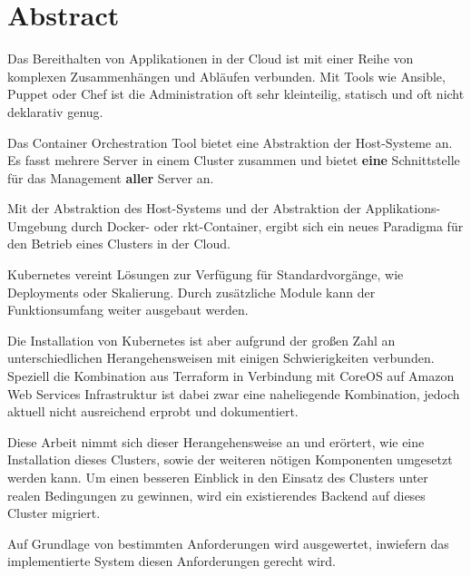 \chapter{Abstract}

Das Bereithalten von Applikationen in der Cloud
ist mit einer Reihe von komplexen Zusammenh\"angen und Abl\"aufen
verbunden. Mit Tools wie Ansible, Puppet oder Chef ist die Administration
oft sehr kleinteilig, statisch und oft nicht deklarativ genug.

Das Container Orchestration Tool  bietet eine Abstraktion
der Host-Systeme an. Es fasst mehrere Server in einem Cluster
zusammen und bietet \textbf{eine} Schnittstelle f\"ur das Management
\textbf{aller} Server an.

Mit der Abstraktion des Host-Systems und der Abstraktion der
Applikations-Umgebung durch Docker- oder rkt-Container, ergibt sich ein
neues Paradigma f\"ur den Betrieb eines Clusters in der Cloud.

Kubernetes vereint L\"osungen zur Verf\"ugung f\"ur Standardvorg\"ange,
wie Deployments oder Skalierung. Durch zus\"atzliche
Module kann der Funktionsumfang weiter ausgebaut werden.

Die Installation von Kubernetes ist aber aufgrund der großen Zahl an
unterschiedlichen Herangehensweisen mit einigen Schwierigkeiten verbunden.
Speziell die Kombination aus Terraform in Verbindung mit CoreOS auf
Amazon Web Services Infrastruktur ist dabei zwar eine naheliegende Kombination,
jedoch aktuell nicht ausreichend erprobt und dokumentiert.

Diese Arbeit nimmt sich dieser Herangehensweise an und er\"ortert, wie
eine Installation dieses Clusters, sowie der weiteren n\"otigen Komponenten
umgesetzt werden kann. Um einen besseren Einblick in den Einsatz des Clusters
unter realen Bedingungen zu gewinnen, wird ein existierendes
Backend auf dieses Cluster migriert.

Auf Grundlage von bestimmten Anforderungen wird ausgewertet, inwiefern
das implementierte System diesen Anforderungen gerecht wird.
